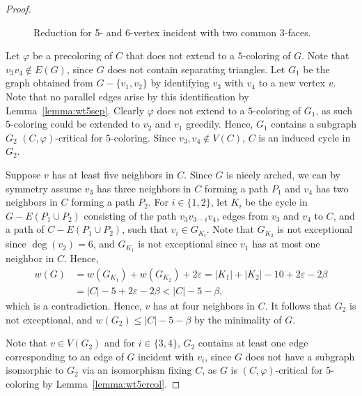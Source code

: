 \documentclass[12pt,twoside,openright,a4paper]{book}
\begin{document}
\begin{proof}
\begin{figure}
\caption{Reduction for 5- and 6-vertex incident with two common 3-faces.}\label{fig:wt5-nofour56}
\end{figure}

Let $\varphi$ be a precoloring of $C$ that does not extend to a $5$-coloring of $G$.
Note that $v_3v_4\not\in E(G)$, since $G$ does not contain separating triangles.
Let $G_1$ be the graph obtained from $G-\{v_1,v_2\}$ by identifying $v_3$ with $v_4$ to a new vertex $v$.
Note that no parallel edges arise by this identification by Lemma~\ref{lemma:wt5sep}.
Clearly $\varphi$ does not extend to a $5$-coloring of $G_1$, as such $5$-coloring could be extended
to $v_2$ and $v_1$ greedily.  Hence, $G_1$ contains a subgraph $G_2$ $(C,\varphi)$-critical for $5$-coloring.
Since $v_3,v_4\not\in V(C)$, $C$ is an induced cycle in $G_2$.

Suppose $v$ has at least five neighbors in $C$.  Since $G$ is nicely arched, we can by symmetry assume
$v_3$ has three neighbors in $C$ forming a path $P_1$ and $v_4$ has two neighbors in $C$ forming a path $P_2$.  For $i\in \{1,2\}$, let
$K_i$ be the cycle in $G-E(P_1\cup P_2)$ consisting of the path $v_3v_{3-i}v_4$, edges from $v_3$ and $v_4$ to $C$,
and a path of $C-E(P_1\cup P_2)$, such that $v_i\in G_{K_i}$.  Note that $G_{K_2}$ is not exceptional since $\deg(v_2)=6$,
and $G_{K_1}$ is not exceptional since $v_1$ has at most one neighbor in $C$.
Hence,
\begin{align*}
w(G)&=w(G_{K_1})+w(G_{K_2})+2\varepsilon=|K_1|+|K_2|-10+2\varepsilon-2\beta\\
&=|C|-5+2\varepsilon-2\beta<|C|-5-\beta,
\end{align*}
which is a contradiction.  Hence, $v$ has at four neighbors in $C$.  It follows that
$G_2$ is not exceptional, and $w(G_2)\le |C|-5-\beta$ by the minimality of $G$.

Note that $v\in V(G_2)$ and for $i\in\{3,4\}$, $G_2$ contains at least one edge corresponding
to an edge of $G$ incident with $v_i$, since $G$ does not have a subgraph isomorphic to $G_2$
via an isomorphism fixing $C$, as $G$ is $(C,\varphi)$-critical for $5$-coloring by Lemma~\ref{lemma:wt5crcol}.


\end{proof}
\end{document}
